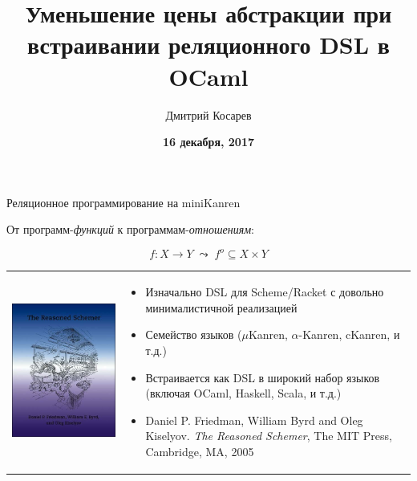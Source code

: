 \documentclass[10pt, mathserif]{beamer}
\title{Уменьшение цены абстракции при встраивании реляционного DSL в OCaml}
\author{Дмитрий Косарев}
\institute[]{
\small{
\textbf{Лаборатория языковых инструментов}
}
}
\date{
  \vskip 2cm
  \small{
  \textbf{16 декабря, 2017}
  }
}
\newcommand{\oo}[1]{{#1}^o}
\theoremstyle{definition}
\begin{document}
\begin{frame}
  \titlepage
\end{frame}

\begin{frame}{Реляционное программирование на miniKanren}
 \begin{center}
 От программ-\emph{функций} к программам-\emph{отношениям}:
 \end{center}

 $$
 f \colon X \to Y\;\leadsto\;\oo{f} \subseteq X\times Y
 $$
 \vskip5mm
 \begin{tabular}{m{4cm}m{6cm}}
    \includegraphics[scale=0.3]{trs.jpg} &
    \begin{itemize}
       \item Изначально DSL для Scheme/Racket с довольно минималистичной реализацией
       \item Семейство языков ($\mu$Kanren, $\alpha$-Kanren, cKanren, и т.д.)
       \item Встраивается как DSL в широкий набор языков (включая OCaml, Haskell, Scala, и т.д.)
       \item Daniel P. Friedman, William Byrd and   Oleg Kiselyov. \emph{The Reasoned Schemer},
       The MIT Press, Cambridge, MA, 2005
    \end{itemize}
 \end{tabular}
 \vskip 3cm
\end{frame}
\end{document}
